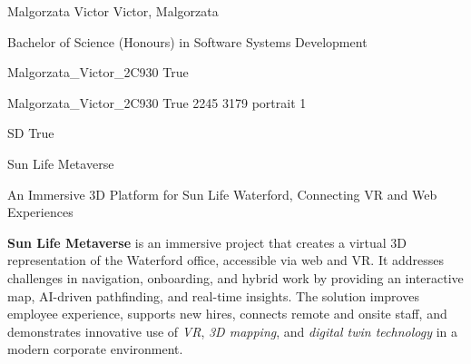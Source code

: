 
\begingroup{}\relax



\def\Key{Malgorzata_Victor_2C930}

{Malgorzata Victor}
{Victor, Malgorzata}

{Bachelor of Science (Honours) in Software Systems Development}

{Malgorzata_Victor_2C930}
{True}

{Malgorzata_Victor_2C930}
{True}
{2245}
{3179}
{portrait}
{1}

{SD}
{True}

{Sun Life Metaverse}

{An Immersive 3D Platform for Sun Life Waterford, Connecting VR and Web Experiences}

{{\bfseries Sun Life Metaverse} is an immersive project that creates a virtual 3D representation of the Waterford office, accessible via web and VR. It addresses challenges in navigation, onboarding, and hybrid work by providing an interactive map, AI-driven pathfinding, and real-time insights. The solution improves employee experience, supports new hires, connects remote and onsite staff, and demonstrates innovative use of \emph{VR}, \emph{3D mapping}, and \emph{digital twin technology} in a modern corporate environment.}

